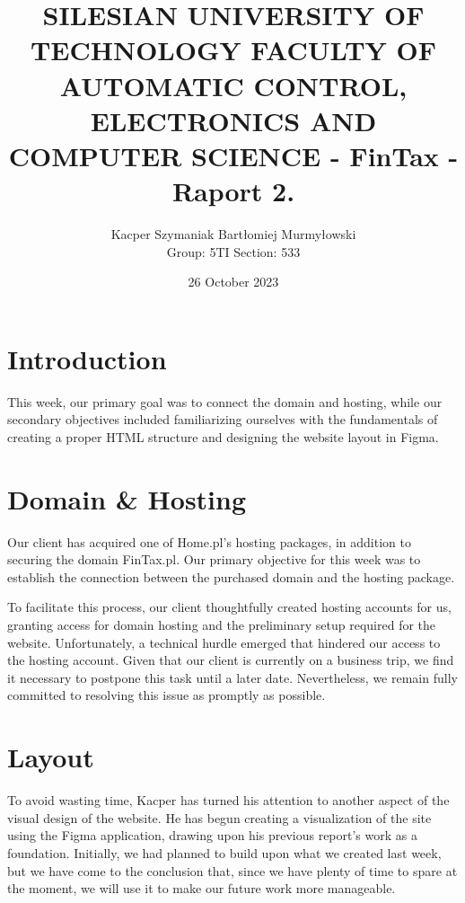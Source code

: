 \documentclass{article}
\title{\textbf{SILESIAN UNIVERSITY OF TECHNOLOGY FACULTY OF AUTOMATIC CONTROL, ELECTRONICS AND COMPUTER SCIENCE - FinTax - Raport 2.
}}
\author{Kacper Szymaniak Bartłomiej Murmyłowski \\
Group: 5TI Section: 533
}
\date{26 October 2023}
\begin{document}
\thispagestyle{empty}
    \maketitle
 \restoregeometry
    \newpage
{}   
\fontsize{14}{16}\selectfont

\tableofcontents

    \newpage
    \section{Introduction}
This week, our primary goal was to connect the domain and hosting, while our secondary objectives included familiarizing ourselves with the fundamentals of creating a proper HTML structure and designing the website layout in Figma.
    \section{Domain & Hosting}

Our client has acquired one of Home.pl's hosting packages, in addition to securing the domain FinTax.pl. Our primary objective for this week was to establish the connection between the purchased domain and the hosting package.

To facilitate this process, our client thoughtfully created hosting accounts for us, granting access for domain hosting and the preliminary setup required for the website. Unfortunately, a technical hurdle emerged that hindered our access to the hosting account. Given that our client is currently on a business trip, we find it necessary to postpone this task until a later date. Nevertheless, we remain fully committed to resolving this issue as promptly as possible.

\section{Layout}
To avoid wasting time, Kacper has turned his attention to another aspect of the visual design of the website. He has begun creating a visualization of the site using the Figma application, drawing upon his previous report's work as a foundation. Initially, we had planned to build upon what we created last week, but we have come to the conclusion that, since we have plenty of time to spare at the moment, we will use it to make our future work more manageable.
\end{document}
